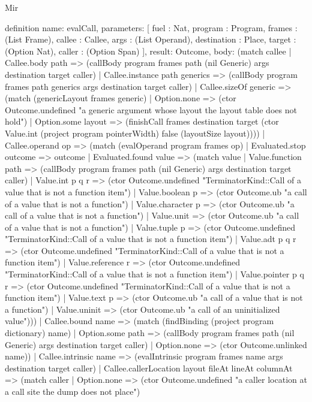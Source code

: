 \begin{lexlean}{Mir}
\begin{semanticmodule}
definition{
  name: evalCall,
  parameters: [
    fuel : Nat,
    program : Program,
    frames : (List Frame),
    callee : Callee,
    args : (List Operand),
    destination : Place,
    target : (Option Nat),
    caller : (Option Span)
  ],
  result: Outcome,
  body: (match callee
    | Callee.body path => (callBody program frames path (nil Generic) args destination target caller)
    | Callee.instance path generics => (callBody program frames path generics args destination target caller)
    | Callee.sizeOf generic => (match (genericLayout frames generic)
      | Option.none => (ctor Outcome.undefined "a generic argument whose layout the layout table does not hold")
      | Option.some layout => (finishCall frames destination target (ctor Value.int (project program pointerWidth) false (layoutSize layout))))
    | Callee.operand op => (match (evalOperand program frames op)
      | Evaluated.stop outcome => outcome
      | Evaluated.found value => (match value
        | Value.function path => (callBody program frames path (nil Generic) args destination target caller)
        | Value.int p q r => (ctor Outcome.undefined "TerminatorKind::Call of a value that is not a function item")
        | Value.boolean p => (ctor Outcome.ub "a call of a value that is not a function")
        | Value.character p => (ctor Outcome.ub "a call of a value that is not a function")
        | Value.unit => (ctor Outcome.ub "a call of a value that is not a function")
        | Value.tuple p => (ctor Outcome.undefined "TerminatorKind::Call of a value that is not a function item")
        | Value.adt p q r => (ctor Outcome.undefined "TerminatorKind::Call of a value that is not a function item")
        | Value.reference r => (ctor Outcome.undefined "TerminatorKind::Call of a value that is not a function item")
        | Value.pointer p q r => (ctor Outcome.undefined "TerminatorKind::Call of a value that is not a function item")
        | Value.text p => (ctor Outcome.ub "a call of a value that is not a function")
        | Value.uninit => (ctor Outcome.ub "a call of an uninitialized value")))
    | Callee.bound name => (match (findBinding (project program dictionary) name)
      | Option.some path => (callBody program frames path (nil Generic) args destination target caller)
      | Option.none => (ctor Outcome.unlinked name))
    | Callee.intrinsic name => (evalIntrinsic program frames name args destination target caller)
    | Callee.callerLocation layout fileAt lineAt columnAt => (match caller
      | Option.none => (ctor Outcome.undefined "a caller location at a call site the dump does not place")
}
\end{semanticmodule}
\end{lexlean}
